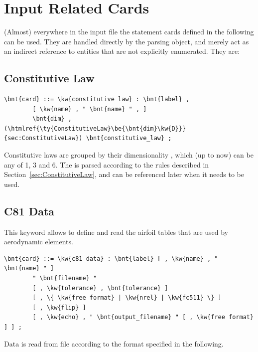 \section{Input Related Cards} 
(Almost) everywhere in the input file the statement cards defined 
in the following can be used.
They are handled directly by the parsing object, and merely act as
an indirect reference to entities that are not explicitly enumerated.
They are:



\subsection{Constitutive Law}\label{sec:CONSTITUTIVE-LAW}
\begin{Verbatim}[commandchars=\\\{\}]
    \bnt{card} ::= \kw{constitutive law} : \bnt{label} ,
        [ \kw{name} , " \bnt{name} " , ]
        \bnt{dim} , (\htmlref{\ty{ConstitutiveLaw}\be{\bnt{dim}\kw{D}}}{sec:ConstitutiveLaw}) \bnt{constitutive_law} ;
\end{Verbatim}
Constitutive laws are grouped by their dimensionality ,
which (up to now) can be any of 1, 3 and 6.
The  is parsed according to the rules
described in Section~\ref{sec:ConstitutiveLaw},
and can be referenced later when it needs to be used.



\subsection{C81 Data}\label{sec:C81-DATA}
This keyword allows to define and read the  
airfoil tables that are used by aerodynamic elements.
\begin{Verbatim}[commandchars=\\\{\}]
    \bnt{card} ::= \kw{c81 data} : \bnt{label} [ , \kw{name} , " \bnt{name} " ]
        " \bnt{filename} "
        [ , \kw{tolerance} , \bnt{tolerance} ]
        [ , \{ \kw{free format} | \kw{nrel} | \kw{fc511} \} ]
        [ , \kw{flip} ]
        [ , \kw{echo} , " \bnt{output_filename} " [ , \kw{free format} ] ] ;
\end{Verbatim}
Data is read from file  according to the format specified
in the following.

